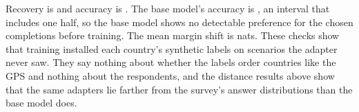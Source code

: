 Recovery is   and accuracy is  . The base model's accuracy is  , an interval that includes one half, so the base model shows no detectable preference for the chosen completions before training. The mean margin shift is   nats. These checks show that training installed each country's synthetic labels on scenarios the adapter never saw. They say nothing about whether the labels order countries like the GPS and nothing about the respondents, and the distance results above show that the same adapters lie farther from the survey's answer distributions than the base model does.
